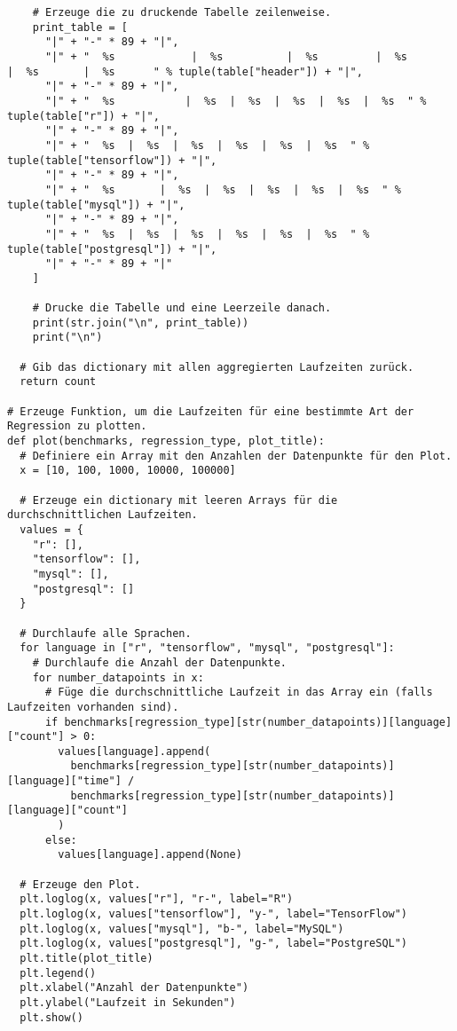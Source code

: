 \begin{verbatim}
    # Erzeuge die zu druckende Tabelle zeilenweise.
    print_table = [
      "|" + "-" * 89 + "|",
      "|" + "  %s            |  %s          |  %s         |  %s        |  %s       |  %s      " % tuple(table["header"]) + "|",
      "|" + "-" * 89 + "|",
      "|" + "  %s           |  %s  |  %s  |  %s  |  %s  |  %s  " % tuple(table["r"]) + "|",
      "|" + "-" * 89 + "|",
      "|" + "  %s  |  %s  |  %s  |  %s  |  %s  |  %s  " % tuple(table["tensorflow"]) + "|",
      "|" + "-" * 89 + "|",
      "|" + "  %s       |  %s  |  %s  |  %s  |  %s  |  %s  " % tuple(table["mysql"]) + "|",
      "|" + "-" * 89 + "|",
      "|" + "  %s  |  %s  |  %s  |  %s  |  %s  |  %s  " % tuple(table["postgresql"]) + "|",
      "|" + "-" * 89 + "|"
    ]

    # Drucke die Tabelle und eine Leerzeile danach.
    print(str.join("\n", print_table))
    print("\n")

  # Gib das dictionary mit allen aggregierten Laufzeiten zurück.
  return count

# Erzeuge Funktion, um die Laufzeiten für eine bestimmte Art der Regression zu plotten.
def plot(benchmarks, regression_type, plot_title):
  # Definiere ein Array mit den Anzahlen der Datenpunkte für den Plot.
  x = [10, 100, 1000, 10000, 100000]

  # Erzeuge ein dictionary mit leeren Arrays für die durchschnittlichen Laufzeiten.
  values = {
    "r": [],
    "tensorflow": [],
    "mysql": [],
    "postgresql": []
  }

  # Durchlaufe alle Sprachen.
  for language in ["r", "tensorflow", "mysql", "postgresql"]:
    # Durchlaufe die Anzahl der Datenpunkte.
    for number_datapoints in x:
      # Füge die durchschnittliche Laufzeit in das Array ein (falls Laufzeiten vorhanden sind).
      if benchmarks[regression_type][str(number_datapoints)][language]["count"] > 0:
        values[language].append(
          benchmarks[regression_type][str(number_datapoints)][language]["time"] /
          benchmarks[regression_type][str(number_datapoints)][language]["count"]
        )
      else:
        values[language].append(None)

  # Erzeuge den Plot.
  plt.loglog(x, values["r"], "r-", label="R")
  plt.loglog(x, values["tensorflow"], "y-", label="TensorFlow")
  plt.loglog(x, values["mysql"], "b-", label="MySQL")
  plt.loglog(x, values["postgresql"], "g-", label="PostgreSQL")
  plt.title(plot_title)
  plt.legend()
  plt.xlabel("Anzahl der Datenpunkte")
  plt.ylabel("Laufzeit in Sekunden")
  plt.show()


\end{verbatim}
